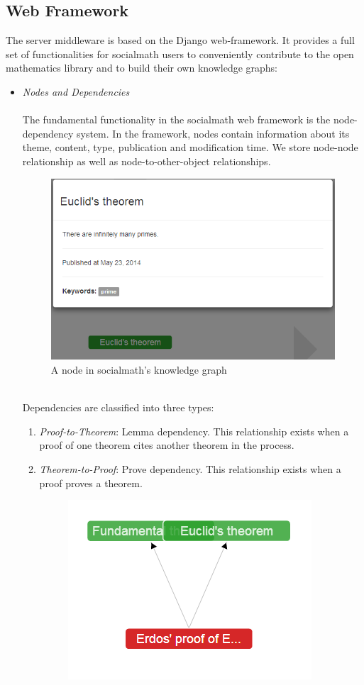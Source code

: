 \documentclass{acm_proc_article-sp}
\begin{document}
\subsection{Web Framework}
The server middleware is based on the Django web-framework. It provides a full set of functionalities for socialmath users to conveniently contribute to the open mathematics library and to build their own knowledge graphs:
\begin{itemize}

\item \emph{Nodes and Dependencies} \\\\
The fundamental functionality in the socialmath web framework is the node-dependency system. In the framework, nodes contain information about its theme, content, type, publication and modification time. We store node-node relationship as well as node-to-other-object relationships. 
\begin{figure}[h!]
\centering
\includegraphics[scale=0.37]{oneNode.png}
\caption{A node in socialmath's knowledge graph}
\end{figure}\\
Dependencies are classified into three types:
\begin{enumerate}
\item \emph{Proof-to-Theorem}: Lemma dependency. This relationship exists when a proof of one theorem cites another theorem in the process. 
\item \emph{Theorem-to-Proof}: Prove dependency. This relationship exists when a proof proves a theorem. 
\begin{figure}[h!]
\centering
\includegraphics[scale=0.3]{prove_lemma_relationship.png}

\end{figure}
\end{enumerate}
\end{itemize}
\end{document}
